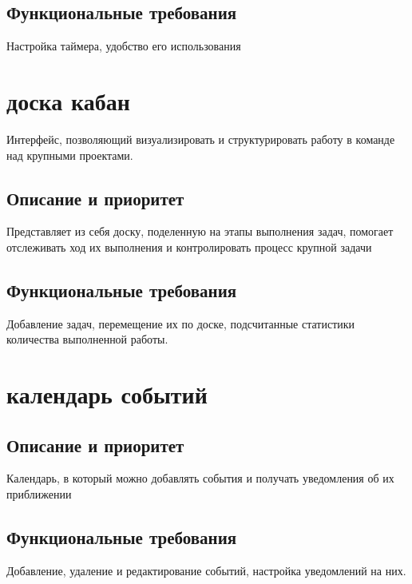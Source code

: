 \subsection{Функциональные требования}
Настройка таймера, удобство его использования


\section{доска кабан}
Интерфейс, позволяющий визуализировать и структурировать работу в команде над крупными проектами.

\subsection{Описание и приоритет}
Представляет из себя доску, поделенную на этапы выполнения задач, помогает отслеживать ход их выполнения и контролировать процесс крупной задачи

\subsection{Функциональные требования}
Добавление задач, перемещение их по доске, подсчитанные статистики количества выполненной работы.


\section{календарь событий}

\subsection{Описание и приоритет}
Календарь, в который можно добавлять события и получать уведомления об их приближении

\subsection{Функциональные требования}
Добавление, удаление и редактирование событий, настройка уведомлений на них.